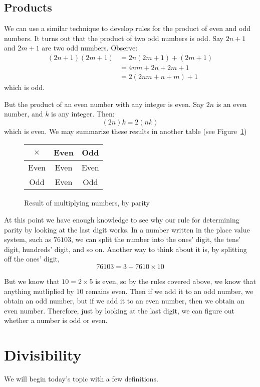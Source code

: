 \documentclass[a4paper,10pt]{report}
\begin{document}
\subsection{Products}

We can use a similar technique to develop rules for the product of even and odd
numbers. It turns out that the product of two odd numbers is odd. Say $2n+1$
and $2m+1$ are two odd numbers. Observe: \begin{align*}
 (2n+1)(2m+1)
 &= 2n(2m+1) + (2m+1) \\
 &= 4nm+2n+2m+1 \\
 &= 2(2nm+n+m) + 1
\end{align*} which is odd.

But the product of an even number with any integer is even. Say $2n$ is an
even number, and $k$ is any integer. Then: \[
 (2n)k = 2(nk)
\] which is even. We may summarize these results in another table (see
Figure~\ref{pd:pprodt})

\begin{figure}
 \begin{tabular}{c|cc}
  $\times$ & Even & Odd  \\
  \hline
  Even   & Even & Even \\
  Odd    & Even & Odd
 \end{tabular}

 \caption{Result of multiplying numbers, by parity}
 \label{pd:pprodt}
\end{figure}

At this point we have enough knowledge to see why our rule for determining
parity by looking at the last digit works. In a number written in the place
value system, such as $76103$, we can split the number into the ones' digit,
the tens' digit, hundreds' digit, and so on. Another way to think about it is,
by splitting off the ones' digit, \[
 76103 = 3 + 7610 \times 10
\]

But we know that $10=2\times5$ is even, so by the rules covered above, we know
that anything mutliplied by $10$ remains even. Then if we add it to an odd
number, we obtain an odd number, but if we add it to an even number, then we
obtain an even number. Therefore, just by looking at the last digit, we can
figure out whether a number is odd or even.

\section{Divisibility}

We will begin today's topic with a few definitions.
\end{document}
